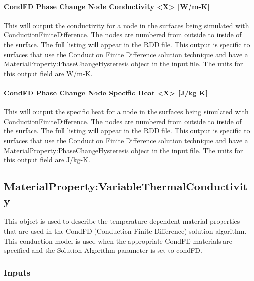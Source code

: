 \paragraph{CondFD Phase Change Node Conductivity \textless{}X\textgreater{} {[}W/m-K{]}}\label{condfd-phase-change-node-conductivity-x-w-m-k}

This will output the conductivity for a node in the surfaces being simulated with ConductionFiniteDifference.  The nodes are numbered from outside to inside of the surface. The full listing will appear in the RDD file.  This output is specific to surfaces that use the Conduction Finite Difference solution technique and have a \hyperref[materialpropertyphasechangehysteresis]{MaterialProperty:PhaseChangeHysteresis} object in the input file.  The units for this output field are W/m-K.

\paragraph{CondFD Phase Change Node Specific Heat \textless{}X\textgreater{} {[}J/kg-K{]}}\label{condfd-phase-change-node-specific-heat-x-j-kg-k}

This will output the specific heat for a node in the surfaces being simulated with ConductionFiniteDifference.  The nodes are numbered from outside to inside of the surface. The full listing will appear in the RDD file.  This output is specific to surfaces that use the Conduction Finite Difference solution technique and have a \hyperref[materialpropertyphasechangehysteresis]{MaterialProperty:PhaseChangeHysteresis} object in the input file.  The units for this output field are J/kg-K.

\subsection{MaterialProperty:VariableThermalConductivity}\label{materialpropertyvariablethermalconductivity}

This object is used to describe the temperature dependent material properties that are used in the CondFD (Conduction Finite Difference) solution algorithm. This conduction model is used when the appropriate CondFD materials are specified and the Solution Algorithm parameter is set to condFD.

\subsubsection{Inputs}\label{inputs-6-027}

